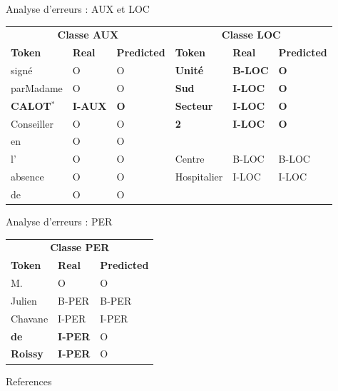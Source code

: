 \documentclass[10pt]{beamer}
\begin{document}
\begin{frame}{Analyse d'erreurs : AUX et LOC}
\begin{tabular}{@{}lll|lll@{}}
	\toprule
	\multicolumn{3}{c}{\textbf{Classe AUX}} &  \multicolumn{3}{c}{\textbf{Classe LOC}} \\
	\textbf{Token}    & \textbf{Real} & \textbf{Predicted} & \textbf{Token}    & \textbf{Real} & \textbf{Predicted} \\ \midrule
	signé             & O                 & O                      & \textbf{Unité}                & \textbf{B-LOC}             & \textbf{O}                  \\
	parMadame         & O                 & O                      & \textbf{Sud}            & \textbf{I-LOC}             & \textbf{O}                  \\
	\textbf{CALOT$^*$}    & \textbf{I-AUX}    & \textbf{O}             & \textbf{Secteur}       & \textbf{I-LOC}    & \textbf{O}             \\
	Conseiller        & O                 & O                      & \textbf{2}    & \textbf{I-LOC}    & \textbf{O}             \\
	en                & O                 & O                      & 	               &                   &                        \\
	l'                & O                 & O                      & Centre                & B-LOC                 & B-LOC                      \\
	absence           & O                 & O                      & Hospitalier             & I-LOC                 & I-LOC                      \\
	de                & O                 & O                      &                   &                   &                        \\ \bottomrule
\end{tabular}
\end{frame}

\begin{frame}{Analyse d'erreurs : PER}
\begin{center}


\begin{tabular}{@{}lll@{}}
	\toprule
	\multicolumn{3}{c}{\textbf{Classe PER}}\\
	\textbf{Token}    & \textbf{Real} & \textbf{Predicted}  \\ \midrule
	M.             & O                 & O                      \\
	Julien         & B-PER                 & B-PER                      \\
	Chavane    & I-PER    & I-PER         \\
	\textbf{de}        & \textbf{I-PER}                 & O                      \\
	\textbf{Roissy}                & \textbf{I-PER}                 & O                      \\ \bottomrule
\end{tabular}
\end{center}
\end{frame}

\begin{frame}[allowframebreaks]{References}

  
  

\end{frame}
\end{document}
